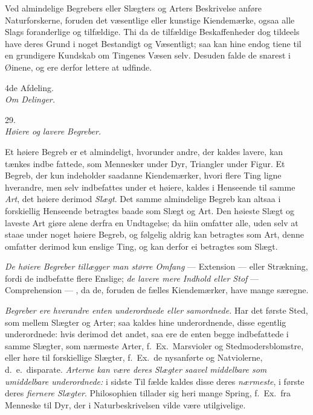 \documentclass[12pt,a4paper]{article}
\newcommand{\logsec}[2]{%
  \bigskip\begin{center}{\large #1}\\[4pt]{\emph{#2}}\end{center}\smallskip}
\newcommand{\opage}[1]{\marginnote{\footnotesize\textit{[#1]}}}
\begin{document}
Ved almindelige Begrebers eller Slægters og Arters Beskrivelse anføre
Naturforskerne, foruden det væsentlige eller kunstige Kiendemærke, ogsaa alle
Slags foranderlige og tilfældige. Thi da de tilfældige Beskaffenheder dog
tildeels have deres Grund i noget Bestandigt og Væsentligt; saa kan hine endog
tiene til en grundigere Kundskab om Tingenes Væsen selv. Desuden falde de
snarest i Øinene, og ere derfor lettere at udfinde.

\bigskip
\begin{center}
  {\Large 4de Afdeling.}\\[6pt]
  {\large \emph{Om Delinger.}}
\end{center}

\logsec{29.}{Høiere og lavere Begreber.}

\noindent
Et høiere Begreb er et almindeligt, hvorunder andre, der kaldes lavere, kan
tænkes indbe%
\opage{96}fattede, som Mennesker under Dyr, Triangler under Figur. Et Begreb, der kun
indeholder saadanne Kiendemærker, hvori flere Ting ligne hverandre, men selv
indbefattes under et høiere, kaldes i Henseende til samme \emph{Art}, det
høiere derimod \emph{Slægt}. Det samme almindelige Begreb kan altsaa i
forskiellig Henseende betragtes baade som Slægt og Art. Den høieste Slægt og
laveste Art giøre alene derfra en Undtagelse; da hiin omfatter alle, uden selv
at staae under noget høiere Begreb, og følgelig aldrig kan betragtes som Art,
denne omfatter derimod kun enslige Ting, og kan derfor ei betragtes som Slægt.

\emph{De høiere Begreber tillægger man større Omfang} --- Extension --- eller
Strækning, fordi de indbefatte flere Enslige; \emph{de lavere mere Indhold eller
Stof} --- Comprehension --- , da de, foruden de fælles Kiendemærker, have mange
særegne.

\emph{Begreber ere hverandre enten underordnede eller samordnede.} Har det
første Sted, som mellem Slægter og Arter; saa kaldes hine underordnende, disse
egentlig underordnede: hvis derimod det andet, saa ere de enten begge
indbefattede i samme Slægter, som nærmeste Arter, f.~Ex.\ Marsvioler og
Stedmodersblomstre, eller høre til forskiellige Slægter, f.~Ex.\ de nysanførte
og Natviolerne, d.~e.\ disparate. \emph{Arterne kan være deres Slægter saavel
middelbare som umiddelbare underordnede:} i sidste Til%
\opage{97}fælde kaldes disse deres \emph{nærmeste}, i første deres \emph{fiernere
Slægter}. Philosophien tillader sig heri mange Spring, f.~Ex.\ fra Menneske til
Dyr, der i Naturbeskrivelsen vilde være utilgivelige.
\end{document}
